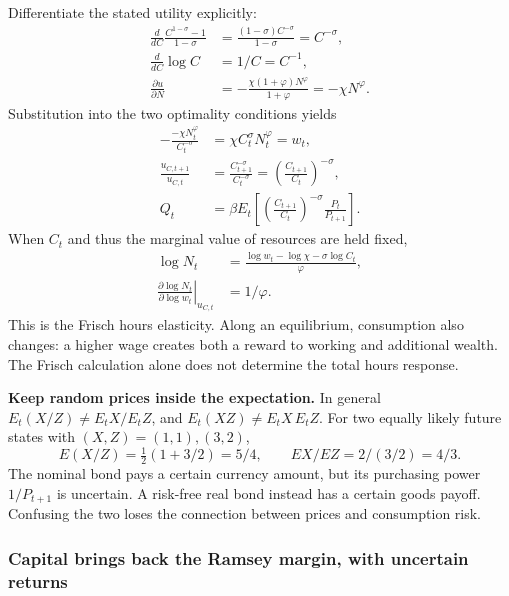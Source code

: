 Differentiate the stated utility explicitly:
\begin{align}
\frac{d}{dC}\frac{C^{1-\sigma}-1}{1-\sigma}
 &=\frac{(1-\sigma)C^{-\sigma}}{1-\sigma}=C^{-\sigma},\\
\frac{d}{dC}\log C&=1/C=C^{-1},\\
\frac{\partial u}{\partial N}
 &=-\frac{\chi(1+\varphi)N^\varphi}{1+\varphi}=-\chi N^\varphi.
\end{align}
Substitution into the two optimality conditions yields
\begin{align}
-\frac{-\chi N_t^\varphi}{C_t^{-\sigma}}
 &=\chi C_t^\sigma N_t^\varphi=w_t,\label{eq:rbc-labor}\\
\frac{u_{C,t+1}}{u_{C,t}}
 &=\frac{C_{t+1}^{-\sigma}}{C_t^{-\sigma}}
   =\left(\frac{C_{t+1}}{C_t}\right)^{-\sigma},\\
Q_t&=\beta E_t\!\left[
\left(\frac{C_{t+1}}{C_t}\right)^{-\sigma}
\frac{P_t}{P_{t+1}}\right].\label{eq:rbc-bond-crra}
\end{align}
When $C_t$ and thus the marginal value of resources are held fixed,
\begin{align}
\log N_t&=\frac{\log w_t-\log\chi-\sigma\log C_t}{\varphi},\\
\left.\frac{\partial\log N_t}{\partial\log w_t}\right|_{u_{C,t}}
 &=1/\varphi.
\end{align}
This is the Frisch hours elasticity. Along an equilibrium, consumption also
changes: a higher wage creates both a reward to working and additional wealth.
The Frisch calculation alone does not determine the total hours response.

\begin{blueblock}
\textbf{Keep random prices inside the expectation.}
In general $E_t(X/Z)\ne E_tX/E_tZ$, and $E_t(XZ)\ne E_tX\,E_tZ$.
For two equally likely future states with $(X,Z)=(1,1),(3,2)$,
\[
E(X/Z)=\tfrac12(1+3/2)=5/4,\qquad EX/EZ=2/(3/2)=4/3.
\]
The nominal bond pays a certain currency amount, but its purchasing power
$1/P_{t+1}$ is uncertain. A risk-free real bond instead has a certain goods
payoff. Confusing the two loses the connection between prices and consumption
risk.
\end{blueblock}

\subsubsection{Capital brings back the Ramsey margin, with uncertain returns}

